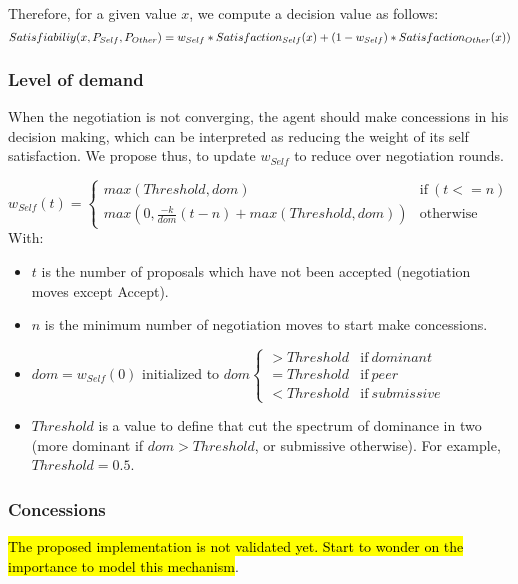 \documentclass{article}
\begin{document}
	Therefore, for a given value $x$,  we compute a decision value as follows:
	\begin{dmath}
	$$Satisfiabiliy(x,P_{Self},P_{Other}) = w_{Self} * Satisfaction_{Self}(x) + (1- w_{Self}) * Satisfaction_{Other}(x))$$
	\end{dmath}
	
	\subsubsection{Level of demand} 
	\label{demand}
	When the negotiation is not converging, the agent should make concessions in his decision making, which can be interpreted as reducing the weight of its self satisfaction. We propose thus, to update $ w_{Self}$ to reduce over negotiation rounds. 
	
	
		$$w_{Self} (t) = \left\{\begin{array}{ll}
		max(Threshold,dom) & \mathrm{if\ }(t<=n)\\
		max(0, \frac{-k}{dom} (t-n)+ max(Threshold,dom)) & \mathrm{otherwise}
		\end{array}\right.$$ With: 
		\begin{itemize}
			\item $t$ is the number of proposals which have not been accepted (negotiation moves except Accept).
			\item $n$ is the minimum number of negotiation moves to start make concessions.
			\item $dom = w_{Self} (0)$ initialized to  
					$dom  \left\{\begin{array}{ll}
					> Threshold& \mathrm{if\ } dominant \\
					= Threshold & \mathrm{if\ } peer \\
					< Threshold & \mathrm{if\ } submissive 
					\end{array}\right.$
			\item $Threshold$ is a value to define that cut the spectrum of dominance in two (more dominant if $ dom > Threshold$, or submissive otherwise). For example, $Threshold = 0.5$.
		 \end{itemize}
	
	
	
	\subsubsection{Concessions }
	\hl{The proposed implementation is not validated yet. Start to wonder on the importance to model this mechanism}.
	
\end{document}
